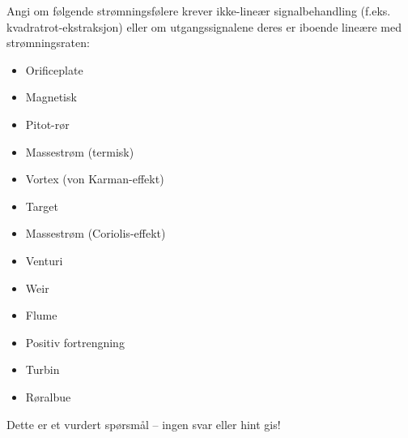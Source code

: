 

Angi om følgende strømningsfølere krever ikke-lineær signalbehandling (f.eks. kvadratrot-ekstraksjon) eller om utgangssignalene deres er iboende lineære med strømningsraten:

\begin{itemize}
\item{} Orificeplate
\vskip 5pt
\item{} Magnetisk
\vskip 5pt
\item{} Pitot-rør
\vskip 5pt
\item{} Massestrøm (termisk)
\vskip 5pt
\item{} Vortex (von Karman-effekt)
\vskip 5pt
\item{} Target
\vskip 5pt
\item{} Massestrøm (Coriolis-effekt)
\vskip 5pt
\item{} Venturi
\vskip 5pt
\item{} Weir
\vskip 5pt
\item{} Flume
\vskip 5pt
\item{} Positiv fortrengning
\vskip 5pt
\item{} Turbin
\vskip 5pt
\item{} Røralbue
\end{itemize}

\vfil

\eject






Dette er et vurdert spørsmål -- ingen svar eller hint gis!







